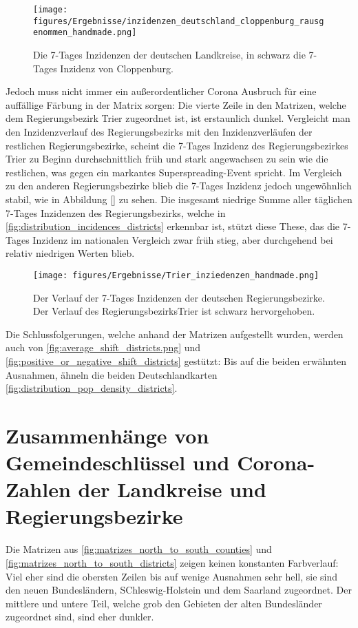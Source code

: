 \begin{figure}
    \centering
    \texttt{[image: figures/Ergebnisse/inzidenzen\_deutschland\_cloppenburg\_rausgenommen\_handmade.png]}
    \caption{Die 7-Tages Inzidenzen der deutschen Landkreise, in schwarz die 7-Tages Inzidenz von Cloppenburg.}
    \label{fig:cloppenburg}
\end{figure}

Jedoch muss nicht immer ein außerordentlicher Corona Ausbruch für eine auffällige Färbung in der Matrix sorgen: Die vierte Zeile in den Matrizen, welche dem Regierungsbezirk Trier zugeordnet ist, ist erstaunlich dunkel.
Vergleicht man den Inzidenzverlauf des Regierungsbezirks mit den Inzidenzverläufen der restlichen Regierungsbezirke, scheint die 7-Tages Inzidenz des Regierungsbezirkes Trier zu Beginn durchschnittlich früh und stark angewachsen zu sein wie die restlichen, was gegen ein markantes Superspreading-Event spricht. Im Vergleich zu den anderen Regierungsbezirke blieb die 7-Tages Inzidenz jedoch ungewöhnlich stabil, wie in Abbildung \autoref{} zu sehen. Die insgesamt niedrige Summe aller täglichen 7-Tages Inzidenzen des Regierungsbezirks, welche in \autoref{fig:distribution_incidences_districts} erkennbar ist, stützt diese These, das die 7-Tages Inzidenz im nationalen Vergleich zwar früh stieg, aber durchgehend bei relativ niedrigen Werten blieb.

\begin{figure}
    \centering
    \texttt{[image: figures/Ergebnisse/Trier\_inziedenzen\_handmade.png]}
    \caption{Der Verlauf der 7-Tages Inzidenzen der deutschen Regierungsbezirke. Der Verlauf des RegierungsbezirksTrier ist schwarz hervorgehoben.}
    \label{fig:my_label}
\end{figure}



Die Schlussfolgerungen, welche anhand der Matrizen aufgestellt wurden, werden auch von \autoref{fig:average_shift_districts.png} und \autoref{fig:positive_or_negative_shift_districts} gestützt: Bis auf die beiden erwähnten Ausnahmen, ähneln die beiden Deutschlandkarten \autoref{fig:distribution_pop_density_districts}.

\section{Zusammenhänge von Gemeindeschlüssel und Corona-Zahlen der Landkreise und Regierungsbezirke}
Die Matrizen aus \autoref{fig:matrizes_north_to_south_counties} und \autoref{fig:matrizes_north_to_south_districts} zeigen keinen konstanten Farbverlauf: Viel eher sind die obersten Zeilen bis auf wenige Ausnahmen sehr hell, sie sind den neuen Bundesländern, SChleswig-Holstein und dem Saarland zugeordnet. Der mittlere und untere Teil, welche grob den Gebieten der alten Bundesländer zugeordnet sind, sind eher dunkler.

